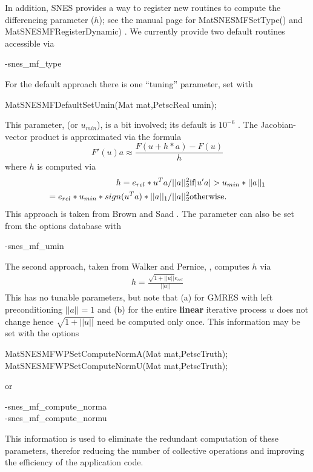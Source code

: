 In addition, SNES provides a way to register new routines to compute the differencing parameter ($h$);
see the manual page for MatSNESMFSetType() and MatSNESMFRegisterDynamic) 
. We currently provide two default routines accessible via
\begin{tabbing}
  -snes\_mf\_type 
\end{tabbing}
For the default approach there is one ``tuning'' parameter, set with 
\begin{tabbing}
  MatSNESMFDefaultSetUmin(Mat mat,PetscReal umin);
\end{tabbing}
This parameter,  (or $u_{min}$), is a bit involved; its default is 
$ 10^{-6} $ . The Jacobian-vector product is approximated via the formula
\[
    F'(u) a \approx \frac{F(u + h*a) - F(u)}{h}
\]
where $ h $ is computed via 
\begin{eqnarray*}
        h = e_{rel}*u^{T}a/||a||^2_2                       &    \hbox{if}  |u'a| > u_{min}*||a||_{1} \\
          = e_{rel}*u_{min}*sign(u^{T}a)*||a||_{1}/||a||^2_2  &    \hbox{otherwise}.
\end{eqnarray*}
This approach is taken from Brown and Saad \cite{brownsaad:90}.
The parameter can also be set from the options database with 
\begin{tabbing}
   -snes\_mf\_umin 
\end{tabbing}

The second approach, taken from Walker and Pernice, \cite{pw98}, computes $ h $ via
\begin{eqnarray*}
        h = \frac{\sqrt{1 + ||u||}e_{rel}}{||a||}
\end{eqnarray*}
This has no tunable parameters, but note that (a) for GMRES with left preconditioning
$ ||a|| = 1 $ and (b) for the entire {\bf linear} iterative process $ u $ does not change hence
$\sqrt{1 + ||u||} $ need be computed only once. This information may be set with the 
options
\begin{tabbing}
  MatSNESMFWPSetComputeNormA(Mat mat,PetscTruth);\\
  MatSNESMFWPSetComputeNormU(Mat mat,PetscTruth);
\end{tabbing}
or 
\begin{tabbing}
   -snes\_mf\_compute\_norma\\
   -snes\_mf\_compute\_normu 
\end{tabbing}
This information is used to eliminate the redundant computation of these parameters,
therefor reducing the number of collective operations and improving the efficiency of the 
application code.

